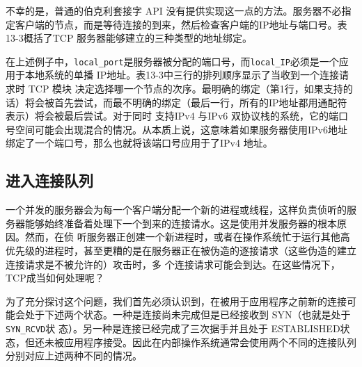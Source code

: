 不幸的是，普通的伯克利套接字 API 没有提供实现这一点的方法。服务器不必指定客户端的节点，而是等待连接的到来，然后检查客户端的IP地址与端口号。表13-3概括了TCP
服务器能够建立的三种类型的地址绑定。

在上述例子中，\verb|local_port|是服务器被分配的端口号，而\verb|local_IP|必须是一个应用于本地系统的单播 IP地址。表13-3中三行的排列顺序显示了当收到一个连接请求时 TCP 模块
决定选择哪一个节点的次序。最明确的绑定（第1行，如果支持的话）将会被首先尝试，而最不明确的绑定（最后一行，所有的IP地址都用通配符表示）将会被最后尝试。对于同时
支持IPv4 与IPv6 双协议栈的系统，它的端口号空间可能会出现混合的情况。从本质上说，这意味着如果服务器使用IPv6地址绑定了一个端口号，那么也就将该端口号应用于了IPv4
地址。
\subsection{进入连接队列}
一个并发的服务器会为每一个客户端分配一个新的进程或线程，这样负责侦听的服务器能够始终准备着处理下一个到来的连接请水。这是使用并发服务器的根本原因。然而，在侦
听服务器正创建一个新进程时，或者在操作系统忙于运行其他高优先级的进程时，甚至更糟的是在服务器正在被伪造的逐接请求（这些伪造的建立连接请求是不被允许的）攻击时，多
个连接请求可能会到达。在这些情况下，TCP成当如何处理呢？

为了充分探讨这个问题，我们首先必须认识到，在被用于应用程序之前新的连接可能会处于下述两个状态。一种是连接尚未完成但是已经接收到 SYN（也就是处于 \verb|SYN_RCVD|状
态）。另一种是连接已经完成了三次据手并且处于 ESTABLISHED状态，但还未被应用程序接受。因此在内部操作系统通常会使用两个不同的连接队列分别对应上述两种不同的情况。

